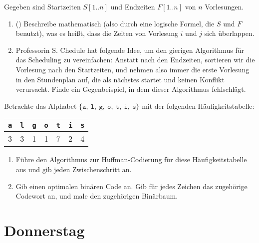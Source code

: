 \documentclass{uebung_cs}
\begin{document}
\begin{aufgabe}[Scheduling]
    Gegeben sind Startzeiten $S[1..n]$ und Endzeiten $F[1..n]$ von $n$ Vorlesungen.
    \begin{enumerate}
        \item(\warmup) Beschreibe mathematisch (also durch eine logische Formel, die $S$ und $F$ benutzt), was es heißt, dass die Zeiten von Vorlesung $i$ und $j$ sich überlappen.
        \item Professorin S. Chedule hat folgende Idee, um den gierigen Algorithmus für das Scheduling zu vereinfachen: Anstatt nach den Endzeiten, sortieren wir die Vorlesung nach den Startzeiten, und nehmen also immer die erste Vorlesung in den Stundenplan auf, die als nächstes startet und keinen Konflikt verursacht. Finde ein Gegenbeispiel, in dem dieser Algorithmus fehlschlägt.
    \end{enumerate}
\end{aufgabe}


\begin{aufgabe}
    Betrachte das Alphabet $\{\texttt a,\ \texttt l,\ \texttt g,\ \texttt o,\ \texttt t,\ \texttt i,\ \texttt s\}$ mit der folgenden Häufigkeitstabelle:
	\begin{center}
		\begin{tabular}{ccccccc}
			\texttt{a}&\texttt{l}&\texttt{g}&\texttt{o}&\texttt{t}&\texttt{i}&\texttt{s}\\\hline
			3&3&1&1&7&2&4\\
		\end{tabular}
	\end{center}
    \begin{enumerate}
        \item Führe den Algorithmus zur Huffman-Codierung für diese Häufigkeitstabelle aus und gib jeden Zwischenschritt an.
        \item Gib einen optimalen binären Code an. Gib für jedes Zeichen das zugehörige Codewort an, und male den zugehörigen Binärbaum.
    \end{enumerate}
\end{aufgabe}


\section*{Donnerstag}
\begin{aufgabe}

\end{aufgabe}

\begin{aufgabe}[Balance]
    
\end{aufgabe}
    
\begin{aufgabe}
\end{aufgabe}
\end{document}
